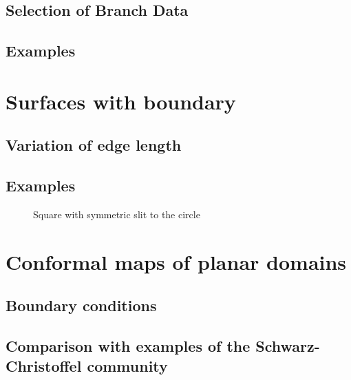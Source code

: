 \subsection{Selection of Branch Data}
\subsection{Examples}

\section{Surfaces with boundary}
\label{sec:surfaces_with_boundary}
\subsection{Variation of edge length}
\subsection{Examples}
\begin{figure}
\centering
{}
\caption{Square with symmetric slit to the circle}
\label{fig:slit_circle}
\end{figure}


\section{Conformal maps of planar domains}
\label{sec:planar_domains}
\subsection{Boundary conditions}
\subsection{Comparison with examples of the Schwarz-Christoffel community}



